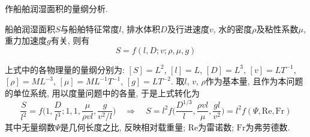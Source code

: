 \begin{problem}[13]
作船舶润湿面积的量纲分析.
\end{problem}
\begin{solution}
\begin{minipage}[c]{0.8\linewidth}
船舶润湿面积$S$与船舶特征常度$l$, 排水体积$D$及行进速度$v$, 水的密度$\rho$及粘性系数$\mu$, 重力加速度$g$有关, 则有
\[
S = f(l,D; v; \rho, \mu, g)
\]
\end{minipage}
\begin{minipage}[c]{0.2\linewidth}
\begin{center}

\end{center}
\end{minipage}\vspace{5pt}
上式中的各物理量的量纲分别为: $[S]=L^2$, $[l]=L$, $[D]=L^3$, $[v]=LT^{-1}$, $[\rho]=ML^{-3}$, $[\mu]=ML^{-1}T^{-1}$, $[g]=LT^{-2}$. 取$l$, $v$, $\rho$作为基本量, 且作为本问题的单位系统, 用以度量问题中的各量, 于是上式转化为
\[
\frac{S}{l^2} = f\bigg(1,\frac{D}{l^3};1,1,\frac{\mu}{\rho v l}, \frac{g}{v^2/l}\bigg)
\quad\Longrightarrow\quad
S = l^2 f\bigg(\frac{D^{1/3}}{l}, \frac{\rho v l}{\mu}, \frac{gl}{v^2}\bigg) = l^2 f(\Psi, \mathrm{Re}, \mathrm{Fr})
\]
其中无量纲数$\Psi$是几何长度之比, 反映相对载重量; $\mathrm{Re}$为雷诺数; $\mathrm{Fr}$为弗劳德数.
\end{solution}
